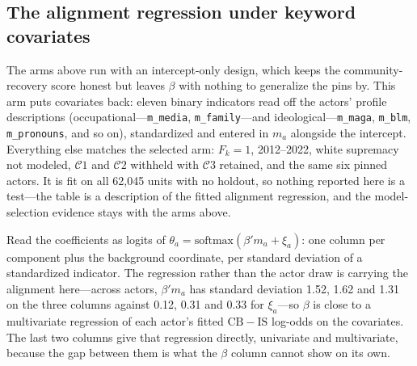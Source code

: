 \subsection*{The alignment regression under keyword covariates}

The arms above run with an intercept-only design, which keeps the community-recovery
score honest but leaves $\beta$ with nothing to generalize the pins by. This arm puts
covariates back: eleven binary indicators read off the actors' profile descriptions
(occupational---\texttt{m\_media}, \texttt{m\_family}---and ideological---\texttt{m\_maga},
\texttt{m\_blm}, \texttt{m\_pronouns}, and so on), standardized and entered in $m_a$
alongside the intercept. Everything else matches the selected arm: $F_k{=}1$, 2012--2022,
white supremacy not modeled, $\mathcal{C}1$ and $\mathcal{C}2$ withheld with
$\mathcal{C}3$ retained, and the same six pinned actors. It is fit on all 62{,}045 units
with no holdout, so nothing reported here is a test---the table is a description of the
fitted alignment regression, and the model-selection evidence stays with the arms above.

Read the coefficients as logits of $\theta_a = \mathrm{softmax}(\beta' m_a + \xi_a)$:
one column per component plus the background coordinate, per standard deviation of a
standardized indicator. The regression rather than the actor draw is carrying the
alignment here---across actors, $\beta' m_a$ has standard deviation 1.52, 1.62 and 1.31
on the three columns against 0.12, 0.31 and 0.33 for $\xi_a$---so $\beta$ is close to a
multivariate regression of each actor's fitted $\mathrm{CB}-\mathrm{IS}$ log-odds on the
covariates. The last two columns give that regression directly, univariate and
multivariate, because the gap between them is what the $\beta$ column cannot show on its
own.

